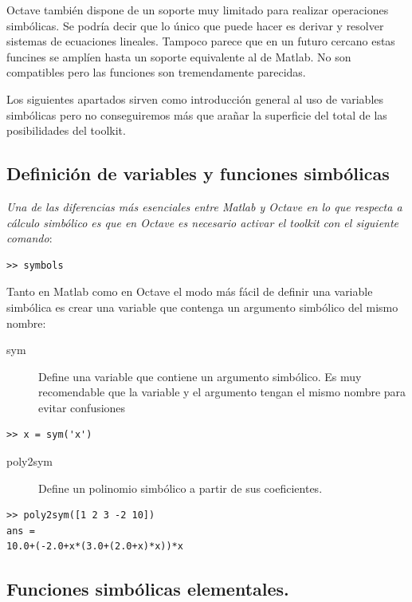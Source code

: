 Octave también dispone de un soporte muy limitado para realizar operaciones
simbólicas. Se podría decir que lo único que puede hacer es derivar
y resolver sistemas de ecuaciones lineales. Tampoco parece que en
un futuro cercano estas funcines se amplíen hasta un soporte equivalente
al de Matlab. No son compatibles pero las funciones son tremendamente
parecidas.

Los siguientes apartados sirven como introducción general al uso de
variables simbólicas pero no conseguiremos más que arañar la superficie
del total de las posibilidades del toolkit.


\subsection{Definición de variables y funciones simbólicas}

\emph{Una de las diferencias más esenciales entre Matlab y Octave en
  lo que respecta a cálculo simbólico es que en Octave es necesario
  activar el toolkit con el siguiente comando}:

\begin{verbatim}
>> symbols
\end{verbatim}
Tanto en Matlab como en Octave el modo más fácil de definir una
variable simbólica es crear una variable que contenga un argumento
simbólico del mismo nombre:

\begin{description}
\item [sym]Define una variable que contiene un argumento
  simbólico.  Es muy recomendable que la variable y el argumento
  tengan el mismo nombre para evitar confusiones
\end{description}
\begin{verbatim}
>> x = sym('x')
\end{verbatim}
\begin{description}
\item [poly2sym]Define un polinomio simbólico a partir
  de sus coeficientes.
\end{description}
\begin{verbatim}
>> poly2sym([1 2 3 -2 10])
ans =
10.0+(-2.0+x*(3.0+(2.0+x)*x))*x
\end{verbatim}

\subsection{Funciones simbólicas elementales.}

